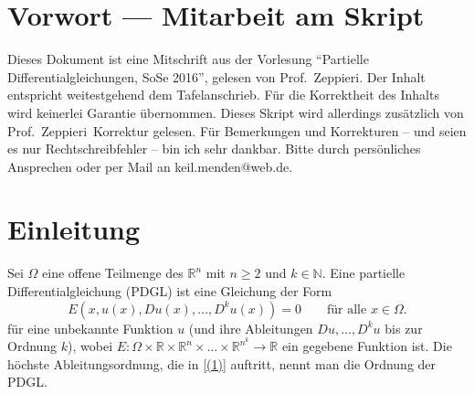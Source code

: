 \newcommand{\Semester}{SoSe 2016}
\newcommand{\fach}{Partielle Differentialgleichungen}
\newcommand{\prof}{Prof.\ Zeppieri}






\maketitle
\cleardoubleoddemptypage

\section*{Vorwort --- Mitarbeit am Skript}
Dieses Dokument ist eine Mitschrift aus der Vorlesung \enquote{\fach, \Semester}, gelesen von \prof. Der Inhalt entspricht weitestgehend dem Tafelanschrieb. Für die Korrektheit des Inhalts wird keinerlei Garantie übernommen. Dieses Skript wird allerdings zusätzlich von \prof \, Korrektur gelesen. Für Bemerkungen und Korrekturen -- und seien es nur Rechtschreibfehler -- bin ich sehr dankbar. Bitte durch persönliches Ansprechen oder per Mail an keil.menden@web.de.

\newpage

\tableofcontents
\cleardoubleoddemptypage
{}
\setcounter{page}{1}

\section{Einleitung} 
\label{sec:einleitung}
\begin{definition}[PDGL]
	Sei $\Omega$ eine offene Teilmenge des $\mathbb{R}^n$ mit $n \geq 2$ und $ k \in \mathbb{N}$. Eine partielle Differentialgleichung (PDGL) ist eine Gleichung der Form
	\begin{equation}\label{(1)}
		E(x,u(x),Du(x),\dots,D^ku(x))=0 \qquad \text{für alle }x \in \Omega.
	\end{equation}
	für eine unbekannte Funktion $u$ (und ihre Ableitungen $Du,\dots,D^ku$ bis zur Ordnung $k$), wobei $E: \Omega \times \mathbb{R} \times \mathbb{R}^n \times \dots \times \mathbb{R}^{n^k} \to \mathbb{R}$ ein gegebene Funktion ist. Die höchste Ableitungsordnung, die in \eqref{(1)} auftritt, nennt man die Ordnung der PDGL.
\end{definition}


